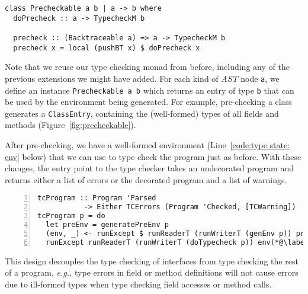 \documentclass[sigplan,screen]{acmart}
\makeatletter
\newcommand{\ec}[1]{\lstinline[style=encore,breaklines=true,basicstyle=\fontsize{9}{9}\tt]@#1@}
\newcommand{\astt}[0]{\textit{AST}}
\makeatother
\begin{document}
\begin{minipage}[t]{\linewidth}
\begin{lstlisting}[style=encore]
class Precheckable a b | a -> b where
  doPrecheck :: a -> TypecheckM b

  precheck :: (Backtraceable a) => a -> TypecheckM b
  precheck x = local (pushBT x) $ doPrecheck x
\end{lstlisting}
\end{minipage}

Note that we reuse our type checking monad from before, including
any of the previous extensions we might have added.
%
For each kind of \astt{} node \ec{a}, we define an instance
\ec{Precheckable a b} which returns an entry of type \ec{b} that
can be used by the environment being generated. For example,
pre-checking a class generates a \ec{ClassEntry}, containing the
(well-formed) types of all fields and methods (Figure~\ref{fig:precheckable}).

After pre-checking, we have a well-formed environment (Line~\ref{code:type state: env} below) that we can
use to type check the program just as before. With these changes, the entry point to the type checker
takes an undecorated program and returns either a list of errors or
the decorated program and a list of warnings.


\begin{minipage}[t]{\linewidth}
\begin{lstlisting}[style=encore,numbers=left,xleftmargin=8px]
tcProgram :: Program 'Parsed
           -> Either TCErrors (Program 'Checked, [TCWarning])
tcProgram p = do
  let preEnv = generatePreEnv p
  (env, _) <- runExcept $ runReaderT (runWriterT (genEnv p)) preEnv (*@\label{code:type state: env}@*)
  runExcept runReaderT (runWriterT (doTypecheck p)) env(*@\label{code:type state: tc}@*)
\end{lstlisting}
\end{minipage}

This design decouples the type checking of interfaces from type
checking the rest of a program, \textit{e.g.,} type errors in
field or method definitions will not cause errors due to
ill-formed types when type checking field accesses or method
calls.
\end{document}
